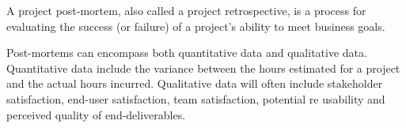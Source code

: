 A project post-mortem, also called a project retrospective, is a process for evaluating the success (or failure) of a project's ability to meet business goals. 

Post-mortems can encompass both quantitative data and qualitative data. Quantitative data include the variance between the hours estimated for a project and the actual hours incurred. Qualitative data will often include stakeholder satisfaction, end-user satisfaction, team satisfaction, potential re usability and perceived quality of end-deliverables.